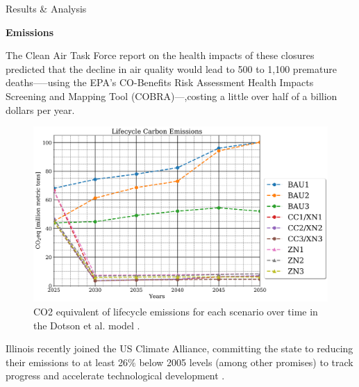 \documentclass[final]{beamer}
\newlength{\onecolwid}
\newlength{\threecolwid}
\begin{document}
\begin{frame}[t]
\begin{columns}[t,totalwidth=\threecolwid]
\begin{column}{\onecolwid}
\begin{block}{Results \& Analysis}

\vspace{0.7em}
\textbf{Emissions}

The Clean Air Task Force report \cite{health} on the health impacts of these closures predicted that the decline in air quality would lead to 500 to 1,100 premature deaths—--using the EPA’s CO-Benefits Risk Assessment Health Impacts Screening and Mapping Tool (COBRA)---,costing a little over half of a billion dollars per year. 
\begin{figure}[ht]
  \centering
  \includegraphics[scale=0.7]{co2eq_all_comparison.png}
  \caption{CO2 equivalent of lifecycle emissions for each scenario over time in the Dotson et al. model \cite{dotson}.}
  \label{fig:co2eq_time}
\end{figure}

Illinois recently joined the US Climate Alliance, committing the state to reducing their emissions to at least 26$\%$ below 2005 levels (among other promises) to track progress and accelerate technological development \cite{climate}.


\end{block}
\end{column}
\end{columns}
\end{frame}
\end{document}
